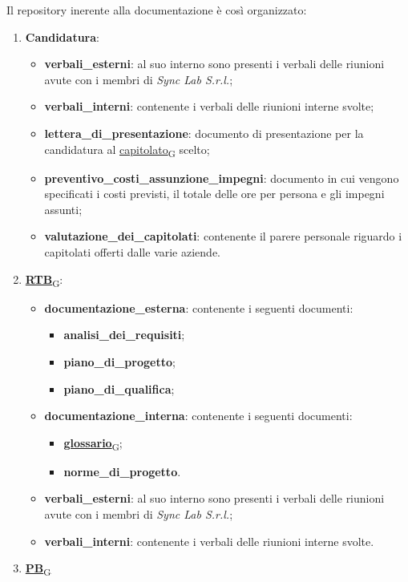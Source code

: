 Il repository inerente alla documentazione è così organizzato:
\begin{enumerate}
	\item \textbf{Candidatura}:
	      \begin{itemize}
		      \item \textbf{verbali\_esterni}: al suo interno sono presenti i verbali delle riunioni avute con i membri di \textit{Sync Lab S.r.l.};
		      \item \textbf{verbali\_interni}: contenente i verbali delle riunioni interne svolte;
		      \item \textbf{lettera\_di\_presentazione}: documento di presentazione per la candidatura al \href{https://7last.github.io/docs/rtb/documentazione-interna/glossario\#capitolato}{capitolato\textsubscript{G}} scelto;
		      \item \textbf{preventivo\_costi\_assunzione\_impegni}: documento in cui vengono specificati i costi previsti, il totale delle ore per persona e gli impegni assunti;
		      \item \textbf{valutazione\_dei\_capitolati}: contenente il parere personale riguardo i capitolati offerti dalle varie aziende.
	      \end{itemize}
	\item \href{https://7last.github.io/docs/rtb/documentazione-interna/glossario\#requirements-and-technology-baseline}{\textbf{RTB}\textsubscript{G}}:
	      \begin{itemize}
		      \item \textbf{documentazione\_esterna}: contenente i seguenti documenti:
		            \begin{itemize}
			            \item \textbf{analisi\_dei\_requisiti};
			            \item \textbf{piano\_di\_progetto};
			            \item \textbf{piano\_di\_qualifica};
		            \end{itemize}
		      \item \textbf{documentazione\_interna}: contenente i seguenti documenti:
		            \begin{itemize}
			            \item \href{https://7last.github.io/docs/rtb/documentazione-interna/glossario\#glossario}{\textbf{glossario}\textsubscript{G}};
			            \item \textbf{norme\_di\_progetto}.
		            \end{itemize}
		      \item \textbf{verbali\_esterni}: al suo interno sono presenti i verbali delle riunioni avute con i membri di \textit{Sync Lab S.r.l.};
		      \item \textbf{verbali\_interni}: contenente i verbali delle riunioni interne svolte.
	      \end{itemize}
	\item \href{https://7last.github.io/docs/rtb/documentazione-interna/glossario\#product-baseline}{\textbf{PB}\textsubscript{G}} %
\end{enumerate}

